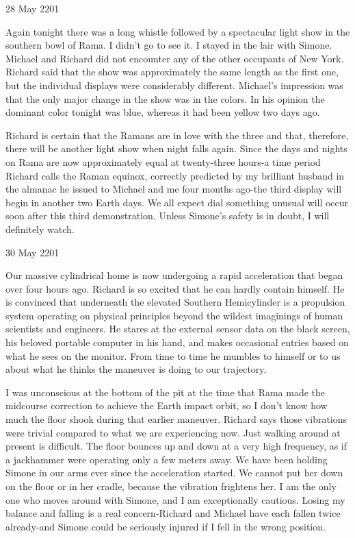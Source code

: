 \documentclass[]{article}
\begin{document}
28 May 2201

Again tonight there was a long whistle followed by a spectacular light show in the southern bowl of Rama. I didn’t go to see it. I stayed in the lair with Simone. Michael and Richard did not encounter any of the other occupants of New York. Richard said that the show was approximately the same length as the first one, but the individual displays were considerably different. Michael’s impression was that the only major change in the show was in the colors. In his opinion the dominant color tonight was blue, whereas it had been yellow two days ago.

Richard is certain that the Ramans are in love with the three and that, therefore, there will be another light show when night falls again. Since the days and nights on Rama are now approximately equal at twenty-three hours-a time period Richard calls the Raman equinox, correctly predicted by my brilliant husband in the almanac he issued to Michael and me four months ago-the third display will begin in another two Earth days. We all expect dial something unusual will occur soon after this third demonstration. Unless Simone’s safety is in doubt, I will definitely watch.

30 May 2201

Our massive cylindrical home is now undergoing a rapid acceleration that began over four hours ago. Richard is so excited that he can hardly contain himself. He is convinced that underneath the elevated Southern Hemicylinder is a propulsion system operating on physical principles beyond the wildest imaginings of human scientists and engineers. He stares at the external sensor data on the black screen, his beloved portable computer in his hand, and makes occasional entries based on what he sees on the monitor. From time to time he mumbles to himself or to us about what he thinks the maneuver is doing to our trajectory.

I was unconscious at the bottom of the pit at the time that Rama made the midcourse correction to achieve the Earth impact orbit, so I don’t know how much the floor shook during that earlier maneuver. Richard says those vibrations were trivial compared to what we are experiencing now. Just walking around at present is difficult. The floor bounces up and down at a very high frequency, as if a jackhammer were operating only a few meters away. We have been holding Simone in our arms ever since the acceleration started. We cannot put her down on the floor or in her cradle, because the vibration frightens her. I am the only one who moves around with Simone, and I am exceptionally cautious. Losing my balance and falling is a real concern-Richard and Michael have each fallen twice already-and Simone could be seriously injured if I fell in the wrong position.
\end{document}
